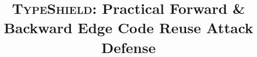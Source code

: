 \documentclass[conference]{IEEEtran}
\theoremstyle{definition}
\begin{document}

\title{\textsc{TypeShield}: Practical Forward \& Backward Edge Code Reuse Attack Defense}






\thispagestyle{plain}
\pagestyle{plain}

\thispagestyle{empty}

\maketitle
\end{document}

